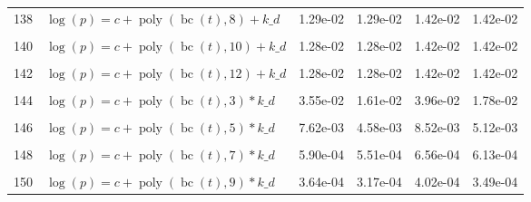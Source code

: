 \documentclass[12pt,a4paper]{article}
\DeclareMathOperator{\bc}{bc}
\DeclareMathOperator{\poly}{poly}
\begin{document}
\begin{longtable}[t]{ll>{\raggedleft\arraybackslash}p{2cm}>{\raggedleft\arraybackslash}p{2cm}>{\raggedleft\arraybackslash}p{2cm}>{\raggedleft\arraybackslash}p{2cm}}
138 & $\log(p) = c + \poly\left( \bc(t), 8 \right) + k\_d$ & 1.29e-02 & 1.29e-02 & 1.42e-02 & 1.42e-02\\
\cellcolor{gray!6}{139} & \cellcolor{gray!6}{$\log(p) = c + \poly\left( \bc(t), 9 \right) + k\_d$} & \cellcolor{gray!6}{1.29e-02} & \cellcolor{gray!6}{1.28e-02} & \cellcolor{gray!6}{1.42e-02} & \cellcolor{gray!6}{1.42e-02}\\
140 & $\log(p) = c + \poly\left( \bc(t), 10 \right) + k\_d$ & 1.28e-02 & 1.28e-02 & 1.42e-02 & 1.42e-02\\
\cellcolor{gray!6}{141} & \cellcolor{gray!6}{$\log(p) = c + \poly\left( \bc(t), 11 \right) + k\_d$} & \cellcolor{gray!6}{1.29e-02} & \cellcolor{gray!6}{1.28e-02} & \cellcolor{gray!6}{1.42e-02} & \cellcolor{gray!6}{1.42e-02}\\
142 & $\log(p) = c + \poly\left( \bc(t), 12 \right) + k\_d$ & 1.28e-02 & 1.28e-02 & 1.42e-02 & 1.42e-02\\
\cellcolor{gray!6}{143} & \cellcolor{gray!6}{$\log(p) = c + \poly\left( \bc(t), 13 \right) + k\_d$} & \cellcolor{gray!6}{1.29e-02} & \cellcolor{gray!6}{1.28e-02} & \cellcolor{gray!6}{1.42e-02} & \cellcolor{gray!6}{1.42e-02}\\
144 & $\log(p) = c + \poly\left( \bc(t), 3 \right) * k\_d$ & 3.55e-02 & 1.61e-02 & 3.96e-02 & 1.78e-02\\
\cellcolor{gray!6}{145} & \cellcolor{gray!6}{$\log(p) = c + \poly\left( \bc(t), 4 \right) * k\_d$} & \cellcolor{gray!6}{1.87e-02} & \cellcolor{gray!6}{1.86e-02} & \cellcolor{gray!6}{2.09e-02} & \cellcolor{gray!6}{2.08e-02}\\
146 & $\log(p) = c + \poly\left( \bc(t), 5 \right) * k\_d$ & 7.62e-03 & 4.58e-03 & 8.52e-03 & 5.12e-03\\
\cellcolor{gray!6}{147} & \cellcolor{gray!6}{$\log(p) = c + \poly\left( \bc(t), 6 \right) * k\_d$} & \cellcolor{gray!6}{7.63e-04} & \cellcolor{gray!6}{6.91e-04} & \cellcolor{gray!6}{8.48e-04} & \cellcolor{gray!6}{7.67e-04}\\
148 & $\log(p) = c + \poly\left( \bc(t), 7 \right) * k\_d$ & 5.90e-04 & 5.51e-04 & 6.56e-04 & 6.13e-04\\
\cellcolor{gray!6}{149} & \cellcolor{gray!6}{$\log(p) = c + \poly\left( \bc(t), 8 \right) * k\_d$} & \cellcolor{gray!6}{3.17e-04} & \cellcolor{gray!6}{2.91e-04} & \cellcolor{gray!6}{3.49e-04} & \cellcolor{gray!6}{3.20e-04}\\
150 & $\log(p) = c + \poly\left( \bc(t), 9 \right) * k\_d$ & 3.64e-04 & 3.17e-04 & 4.02e-04 & 3.49e-04\\

\end{longtable}
\end{document}

